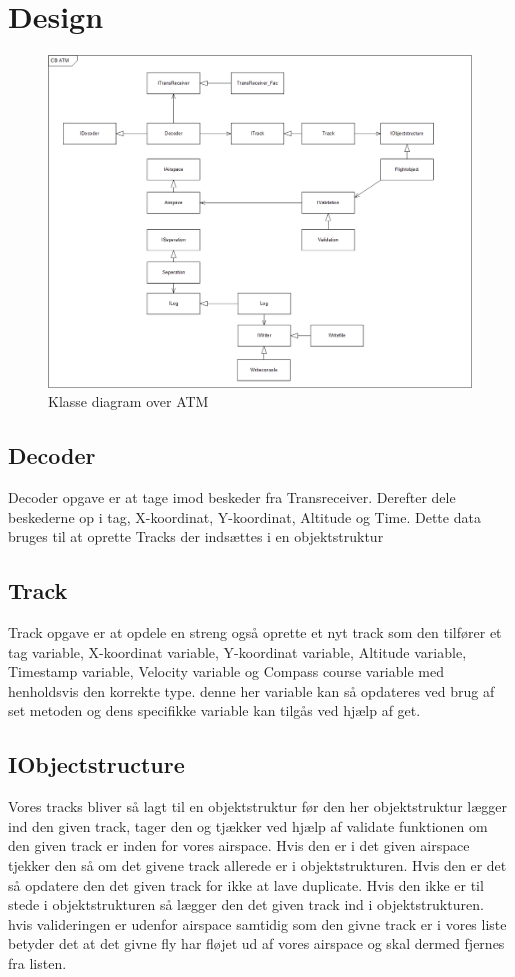 \section{Design}
\begin{figure}[H]
	\centering
	\includegraphics[width=1\linewidth]{../Diagrammer/CD_ATM}
	\caption{Klasse diagram over ATM}
	\label{fig:cdatm}
\end{figure}

\subsection{Decoder}
Decoder opgave er at tage imod beskeder fra Transreceiver. Derefter dele beskederne op i tag, X-koordinat, Y-koordinat, Altitude og Time. Dette data bruges til at oprette Tracks der indsættes i en objektstruktur
\subsection{Track}
Track opgave er at opdele en streng også oprette et nyt track som den tilfører et tag variable, X-koordinat variable, Y-koordinat variable, Altitude variable, Timestamp variable, Velocity variable og Compass course variable med henholdsvis den korrekte type. denne her variable kan så opdateres ved brug af set metoden og dens specifikke variable kan tilgås ved hjælp af get.
\subsection{IObjectstructure}
Vores tracks bliver så lagt til en objektstruktur før den her objektstruktur lægger ind den given track, tager den og tjækker ved hjælp af validate funktionen om den given track er inden for vores airspace. Hvis den er i det given airspace tjekker den så om det givene track allerede er i objektstrukturen. Hvis den er det så opdatere den det given track for ikke at lave duplicate. Hvis den ikke er til stede i objektstrukturen så lægger den det given track ind i objektstrukturen. hvis valideringen er udenfor airspace samtidig som den givne track er i vores liste betyder det at det givne fly har fløjet ud af vores airspace og skal dermed fjernes fra listen.
